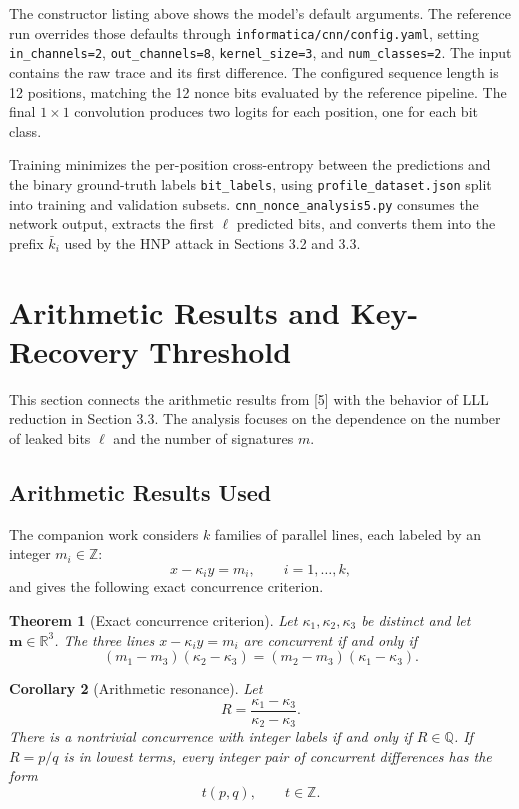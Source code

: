 \documentclass[11pt,a4paper]{article}
\newtheorem{theorem}{Theorem}[section]
\newtheorem{corollary}[theorem]{Corollary}
\begin{document}
The constructor listing above shows the model's default arguments. The reference run overrides those defaults through \texttt{informatica/cnn/config.yaml}, setting \texttt{in\_channels=2}, \texttt{out\_channels=8}, \texttt{kernel\_size=3}, and \texttt{num\_classes=2}. The input contains the raw trace and its first difference. The configured sequence length is 12 positions, matching the 12 nonce bits evaluated by the reference pipeline. The final $1\times1$ convolution produces two logits for each position, one for each bit class.

Training minimizes the per-position cross-entropy between the predictions and the binary ground-truth labels \texttt{bit\_labels}, using \texttt{profile\_dataset.json} split into training and validation subsets. \texttt{cnn\_nonce\_analysis5.py} consumes the network output, extracts the first $\ell$ predicted bits, and converts them into the prefix $\bar{k}_i$ used by the HNP attack in Sections 3.2 and 3.3.

\section{Arithmetic Results and Key-Recovery Threshold}

This section connects the arithmetic results from [5] with the behavior of LLL reduction in Section 3.3. The analysis focuses on the dependence on the number of leaked bits $\ell$ and the number of signatures $m$.

\subsection{Arithmetic Results Used}

The companion work considers $k$ families of parallel lines, each labeled by an integer $m_i\in\mathbb Z$:
\[
x-\kappa_i y=m_i,
\qquad i=1,\ldots,k,
\]
and gives the following exact concurrence criterion.

\begin{theorem}[Exact concurrence criterion]
Let $\kappa_1,\kappa_2,\kappa_3$ be distinct and let $\mathbf m\in\mathbb R^3$. The three lines $x-\kappa_i y=m_i$ are concurrent if and only if
\[
(m_1-m_3)(\kappa_2-\kappa_3)
=
(m_2-m_3)(\kappa_1-\kappa_3).
\]
\end{theorem}

\begin{corollary}[Arithmetic resonance]
Let
\[
R=\frac{\kappa_1-\kappa_3}{\kappa_2-\kappa_3}.
\]
There is a nontrivial concurrence with integer labels if and only if $R\in\mathbb Q$. If $R=p/q$ is in lowest terms, every integer pair of concurrent differences has the form
\[
t(p,q),\qquad t\in\mathbb Z.
\]
\end{corollary}
\end{document}
